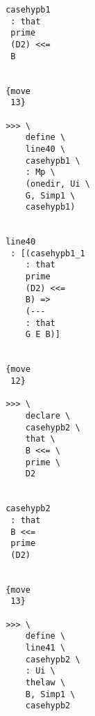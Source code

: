 \documentclass[12pt]{article}
\begin{document}
\begin{verbatim}
                                       casehypb1 
                                        : that 
                                        prime 
                                        (D2) <<= 
                                        B


                                       {move 
                                        13}

                                       >>> \
                                           define \
                                           line40 \
                                           casehypb1 \
                                           : Mp \
                                           (onedir, Ui \
                                           G, Simp1 \
                                           casehypb1)


                                       line40 
                                        : [(casehypb1_1 
                                           : that 
                                           prime 
                                           (D2) <<= 
                                           B) => 
                                           (--- 
                                           : that 
                                           G E B)]


                                       {move 
                                        12}

                                       >>> \
                                           declare \
                                           casehypb2 \
                                           that \
                                           B <<= \
                                           prime \
                                           D2


                                       casehypb2 
                                        : that 
                                        B <<= 
                                        prime 
                                        (D2)


                                       {move 
                                        13}

                                       >>> \
                                           define \
                                           line41 \
                                           casehypb2 \
                                           : Ui \
                                           thelaw \
                                           B, Simp1 \
                                           casehypb2



\end{verbatim}
\end{document}
